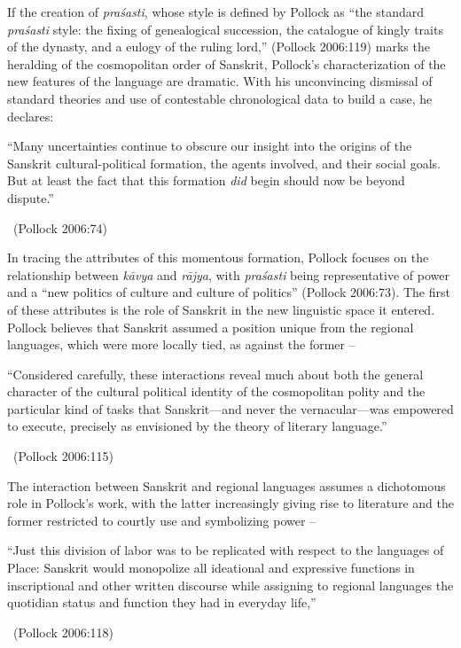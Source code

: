 If the creation of \textit{praśasti}, whose style is defined by Pollock as “the standard \textit{praśasti} style: the fixing of genealogical succession, the catalogue of kingly traits of the dynasty, and a eulogy of the ruling lord,” (Pollock 2006:119) marks the heralding of the cosmopolitan order of Sanskrit, Pollock’s characterization of the new features of the language are dramatic. With his unconvincing dismissal of standard theories and use of contestable chronological data to build a case, he declares:

\begin{myquote}
“Many uncertainties continue to obscure our insight into the origins of the Sanskrit cultural-political formation, the agents involved, and their social goals. But at least the fact that this formation \textit{did} begin should now be beyond dispute.” 

~\hfill (Pollock 2006:74)
\end{myquote}

In tracing the attributes of this momentous formation, Pollock focuses on the relationship between \textit{kāvya} and \textit{rājya}, with \textit{praśasti} being representative of power and a “new politics of culture and culture of politics” (Pollock 2006:73). The first of these attributes is the role of Sanskrit in the new linguistic space it entered. Pollock believes that Sanskrit assumed a position unique from the regional languages, which were more locally tied, as against the former –

\begin{myquote}
“Considered carefully, these interactions reveal much about both the general character of the cultural political identity of the cosmopolitan polity and the particular kind of tasks that Sanskrit—and never the vernacular—was empowered to execute, precisely as envisioned by the theory of literary language.” 

~\hfill (Pollock 2006:115)
\end{myquote}

The interaction between Sanskrit and regional languages assumes a dichotomous role in Pollock’s work, with the latter increasingly giving rise to literature and the former restricted to courtly use and symbolizing power –

\begin{myquote}
“Just this division of labor was to be replicated with respect to the languages of Place: Sanskrit would monopolize all ideational and expressive functions in inscriptional and other written discourse while assigning to regional languages the quotidian status and function they had in everyday life,” 

~\hfill (Pollock 2006:118)
\end{myquote}

